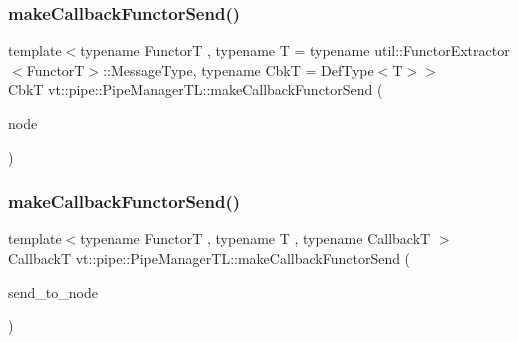 \subsubsection{\texorpdfstring{make\+Callback\+Functor\+Send()}{makeCallbackFunctorSend()}\hspace{0.1cm}{\footnotesize\ttfamily [1/2]}}
{\footnotesize\ttfamily template$<$typename FunctorT , typename T  = typename util\+::\+Functor\+Extractor$<$\+Functor\+T$>$\+::\+Message\+Type, typename CbkT  = Def\+Type$<$\+T$>$$>$ \\
CbkT vt\+::pipe\+::\+Pipe\+Manager\+T\+L\+::make\+Callback\+Functor\+Send (\begin{DoxyParamCaption}\item[{\hyperlink{namespacevt_a866da9d0efc19c0a1ce79e9e492f47e2}{Node\+Type} const \&}]{node }\end{DoxyParamCaption})}

\mbox{\label{structvt_1_1pipe_1_1_pipe_manager_t_l_a2e9eb336fb5e2f6927b64068411ff2c8}} 
\subsubsection{\texorpdfstring{make\+Callback\+Functor\+Send()}{makeCallbackFunctorSend()}\hspace{0.1cm}{\footnotesize\ttfamily [2/2]}}
{\footnotesize\ttfamily template$<$typename FunctorT , typename T , typename CallbackT $>$ \\
CallbackT vt\+::pipe\+::\+Pipe\+Manager\+T\+L\+::make\+Callback\+Functor\+Send (\begin{DoxyParamCaption}\item[{\hyperlink{namespacevt_a866da9d0efc19c0a1ce79e9e492f47e2}{Node\+Type} const \&}]{send\+\_\+to\+\_\+node }\end{DoxyParamCaption})}

\mbox{\label{structvt_1_1pipe_1_1_pipe_manager_t_l_ac2c128da30637e0672086df5abea84a3}} 
